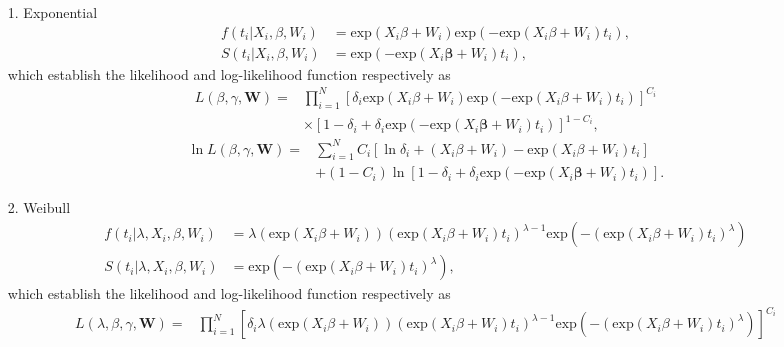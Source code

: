\documentclass[a4paper, 12pt]{article}
\newcommand {\dsum}{\displaystyle \sum}
\newcommand {\dprod}{\displaystyle \prod}
\begin{document}
\begin{itemize}
	\item [1.] Exponential
	\begin{equation}
	\begin{aligned}
	f(t_i|X_i, {\beta}, W_i) &= \mbox{exp}(X_i{\beta}+ W_i)\mbox{exp}(- \mbox{exp}(X_i{\beta}+ W_i)t_i),\\
	S(t_i|X_i, {\beta},  W_i) &= \mbox{exp}(- \mbox{exp}(X_i\mathbf{\beta}+ W_i)t_i),
	\end{aligned}
	\end{equation}
which establish the likelihood and log-likelihood function respectively as
	\begin{equation}
	\begin{aligned}
	L({\beta}, {\gamma}, \mathbf{W})=&\dprod\limits_{i=1}^{N}[\delta _{i}\mbox{exp}(X_i{\beta}+ W_i)\mbox{exp}(- \mbox{exp}(X_i{\beta}+ W_i)t_i)]^{C_i}\\
	&\times [1-\delta _{i}+\delta_i  \mbox{exp}(- \mbox{exp}(X_i\mathbf{\beta}+ W_i)t_i)]^{1-C_{i}},
	\end{aligned}
	\end{equation}
		\begin{equation}
		\begin{aligned}
		\ln L({\beta}, {\gamma}, \mathbf{W})=&\dsum\limits_{i=1}^{N}C_i [\ln\delta _{i}+(X_i{\beta}+ W_i)- \mbox{exp}(X_i{\beta}+ W_i)t_i]\\&+(1-C_i)\ln[1-\delta _{i}+\delta_i  \mbox{exp}(- \mbox{exp}(X_i\mathbf{\beta}+ W_i)t_i)].		
		\end{aligned}
		\end{equation}
	\item [2.] Weibull
	\begin{equation}
	\begin{aligned}
f(t_i|\lambda, X_i, {\beta}, W_i) &= \lambda(\mbox{exp}(X_i{\beta}+W_i)) (\mbox{exp}(X_i{\beta}+W_i)t_i)^{\lambda - 1} \mbox{exp}(-(\mbox{exp}(X_i{\beta}+W_i)t_i)^{\lambda})\\
S(t_i|\lambda, X_i, {\beta}, W_i) &= \mbox{exp}(-(\mbox{exp}(X_i{\beta}+W_i)t_i)^{\lambda}),
	\end{aligned}
	\end{equation}
	which establish the likelihood and log-likelihood function respectively as
	\begin{equation}
	\begin{aligned}
	L(\lambda, {\beta}, {\gamma}, \mathbf{W})=&\dprod\limits_{i=1}^{N}[\delta _{i}\lambda(\mbox{exp}(X_i{\beta}+W_i)) (\mbox{exp}(X_i{\beta}+W_i)t_i)^{\lambda - 1} \mbox{exp}(-(\mbox{exp}(X_i{\beta}+W_i)t_i)^{\lambda})]^{C_i}\\

\end{aligned}
\end{equation}
\end{itemize}
\end{document}
